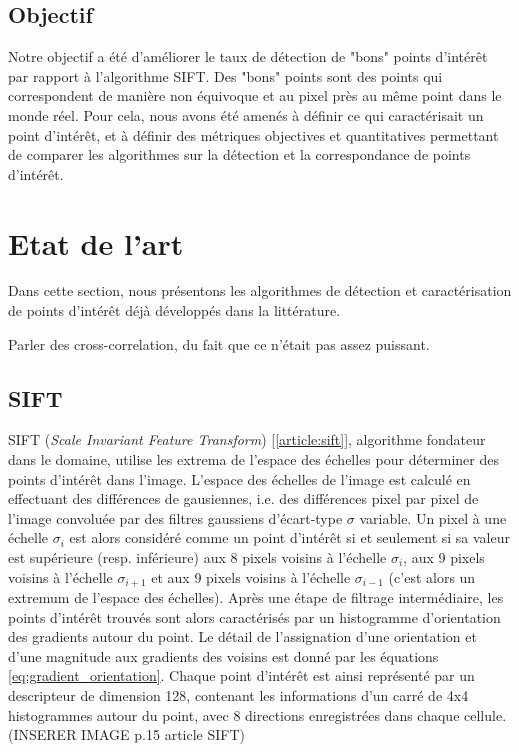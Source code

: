 \documentclass[
	a4paper, %
	10pt, %
	unnumberedsections, %
	twoside, %
]{LTJournalArticle}
\begin{document}
\subsection{Objectif}

Notre objectif a été d'améliorer le taux de détection de "bons" points d'intérêt par rapport à l'algorithme SIFT. Des "bons" points sont des points qui correspondent de manière non équivoque et au pixel près au même point dans le monde réel.
Pour cela, nous avons été amenés à définir ce qui caractérisait un point d'intérêt, et à définir des métriques objectives et quantitatives permettant de comparer les algorithmes sur la détection et la correspondance de points d'intérêt.

\section{Etat de l'art}

Dans cette section, nous présentons les algorithmes de détection et caractérisation de points d'intérêt déjà développés dans la littérature.

Parler des cross-correlation, du fait que ce n'était pas assez puissant.

\subsection{SIFT}

SIFT (\textit{Scale Invariant Feature Transform}) [\ref{article:sift}], algorithme fondateur dans le domaine, utilise les extrema de l'espace des échelles pour déterminer des points d'intérêt dans l'image.
L'espace des échelles de l'image est calculé en effectuant des différences de gausiennes, i.e. des différences pixel par pixel de l'image convoluée par des filtres gaussiens d'écart-type $\sigma$ variable.
Un pixel à une échelle $\sigma_i$ est alors considéré comme un point d'intérêt si et seulement si sa valeur est supérieure (resp. inférieure) aux 8 pixels voisins à l'échelle $\sigma_i$, aux 9 pixels voisins à l'échelle $\sigma_{i+1}$ et aux 9 pixels voisins à l'échelle $\sigma_{i-1}$ (c'est alors un extremum de l'espace des échelles).
Après une étape de filtrage intermédiaire, les points d'intérêt trouvés sont alors caractérisés par un histogramme d'orientation des gradients autour du point.
Le détail de l'assignation d'une orientation et d'une magnitude aux gradients des voisins est donné par les équations \ref{eq:gradient_orientation}.
Chaque point d'intérêt est ainsi représenté par un descripteur de dimension 128, contenant les informations d'un carré de 4x4 histogrammes autour du point, avec 8 directions enregistrées dans chaque cellule. (INSERER IMAGE p.15 article SIFT)
\end{document}
